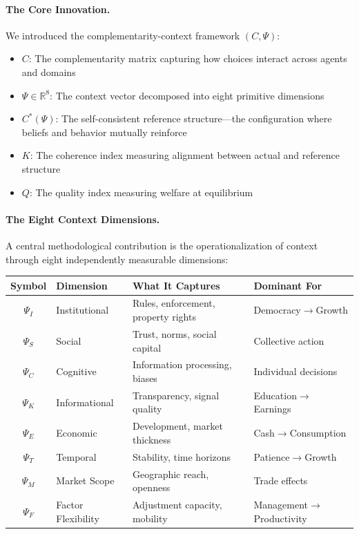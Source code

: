\documentclass[12pt,a4paper]{article}
\begin{document}
\paragraph{The Core Innovation.}
We introduced the complementarity-context framework $(C, \Psi)$:
\begin{itemize}
  \item $C$: The complementarity matrix capturing how choices interact across agents and domains
  \item $\Psi \in \mathbb{R}^8$: The context vector decomposed into eight primitive dimensions
  \item $C^*(\Psi)$: The self-consistent reference structure---the configuration where 
        beliefs and behavior mutually reinforce
  \item $K$: The coherence index measuring alignment between actual and reference structure
  \item $Q$: The quality index measuring welfare at equilibrium
\end{itemize}

\paragraph{The Eight Context Dimensions.}
A central methodological contribution is the operationalization of context through eight independently measurable dimensions:

\begin{center}
\begin{tabular}{@{}clll@{}}
\toprule
\textbf{Symbol} & \textbf{Dimension} & \textbf{What It Captures} & \textbf{Dominant For} \\
\midrule
$\Psi_I$ & Institutional & Rules, enforcement, property rights & Democracy$\rightarrow$Growth \\
$\Psi_S$ & Social & Trust, norms, social capital & Collective action \\
$\Psi_C$ & Cognitive & Information processing, biases & Individual decisions \\
$\Psi_K$ & Informational & Transparency, signal quality & Education$\rightarrow$Earnings \\
$\Psi_E$ & Economic & Development, market thickness & Cash$\rightarrow$Consumption \\
$\Psi_T$ & Temporal & Stability, time horizons & Patience$\rightarrow$Growth \\
$\Psi_M$ & Market Scope & Geographic reach, openness & Trade effects \\
$\Psi_F$ & Factor Flexibility & Adjustment capacity, mobility & Management$\rightarrow$Productivity \\
\bottomrule
\end{tabular}
\end{center}
\end{document}

